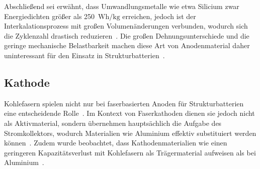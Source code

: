 

Abschließend sei erwähnt, dass Umwandlungsmetalle wie etwa Silicium zwar Energiedichten größer als 250~$\si{\watt \hour \per \kg}$ erreichen, jedoch ist der Interkalationsprozess mit großen Volumenänderungen verbunden, wodurch sich die Zyklenzahl drastisch reduzieren~\cite{Gayet2009, Pereira2019}. Die großen Dehnungsunterschiede und die geringe mechanische Belastbarkeit machen diese Art von Anodenmaterial daher uninteressant für den Einsatz in Strukturbatterien~\cite{Javaid2018}.

\subsection{Kathode}

Kohlefasern spielen nicht nur bei faserbasierten Anoden für Strukturbatterien eine entscheidende Rolle~\cite{Ye2024}. Im Kontext von Faserkathoden dienen sie jedoch nicht als Aktivmaterial, sondern übernehmen hauptsächlich die Aufgabe des Stromkollektors, wodurch Materialien wie Aluminium effektiv substituiert werden können~\cite{Martha2012}. Zudem wurde beobachtet, dass Kathodenmaterialien wie  einen geringeren Kapazitätsverlust mit Kohlefasern als Trägermaterial aufweisen als bei Aluminium~\cite{Martha2011}.

